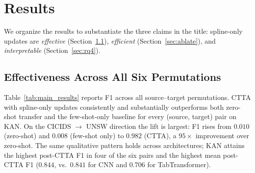 \documentclass[10pt, conference, letterpaper]{IEEEtran}
\begin{document}
\section{Results}
\label{sec:results}

We organize the results to substantiate the three claims in the title: spline-only updates are \emph{effective} (Section~\ref{sec:eff}), \emph{efficient} (Section~\ref{sec:ablate}), and \emph{interpretable} (Section~\ref{sec:rq4}).

\subsection{Effectiveness Across All Six Permutations}
\label{sec:eff}

Table~\ref{tab:main_results} reports F1 across all source--target permutations. CTTA with spline-only updates consistently and substantially outperforms both zero-shot transfer and the few-shot-only baseline for every (source, target) pair on KAN. On the CICIDS $\to$ UNSW direction the lift is largest: F1 rises from $0.010$ (zero-shot) and $0.008$ (few-shot only) to $0.982$ (CTTA), a $95\times$ improvement over zero-shot. The same qualitative pattern holds across architectures; KAN attains the highest post-CTTA F1 in four of the six pairs and the highest mean post-CTTA F1 ($0.844$, vs.\ $0.841$ for CNN and $0.706$ for TabTransformer).
\end{document}
